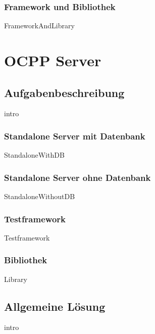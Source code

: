 \documentclass{article}
\begin{document}
        \newpage
        \subsubsection{Framework und Bibliothek}

            {FrameworkAndLibrary}
\newpage



\section{OCPP Server}
\label{kap:implementation}
    \subsection{Aufgabenbeschreibung}
    \label{kap:taskDescription}
        {intro}

        \newpage
        \subsubsection{Standalone Server mit Datenbank}
        \label{kap:taskDescription:standaloneWithDB}
            {StandaloneWithDB}

        \newpage
        \subsubsection{Standalone Server ohne Datenbank}
        {StandaloneWithoutDB}

        \newpage
        \subsubsection{Testframework}
            {Testframework}

        \newpage
        \subsubsection{Bibliothek}
            {Library}
    \newpage
    \subsection{Allgemeine Lösung}
    \label{kap:commonSolution}
        {intro}
\end{document}
